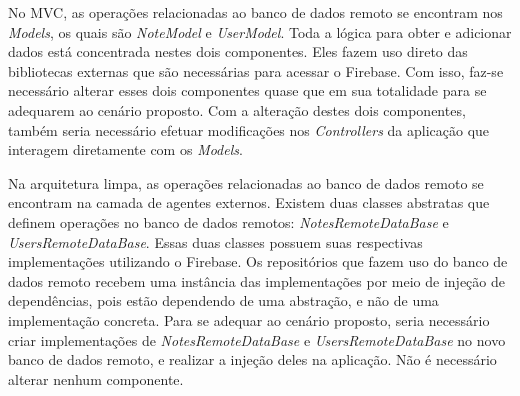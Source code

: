 No MVC, as operações relacionadas ao banco de dados remoto se encontram nos \emph{Models}, os quais são \emph{NoteModel} e \emph{UserModel}.
Toda a lógica para obter e adicionar dados está concentrada nestes dois componentes.
Eles fazem uso direto das bibliotecas externas que são necessárias para acessar o Firebase.
Com isso, faz-se necessário alterar esses dois componentes quase que em sua totalidade para se adequarem ao cenário proposto.
Com a alteração destes dois componentes, também seria necessário efetuar modificações nos \emph{Controllers} da aplicação que interagem diretamente com os \emph{Models}.

Na arquitetura limpa, as operações relacionadas ao banco de dados remoto se encontram na camada de agentes externos.
Existem duas classes abstratas que definem operações no banco de dados remotos: \emph{NotesRemoteDataBase} e \emph{UsersRemoteDataBase}.
Essas duas classes possuem suas respectivas implementações utilizando o Firebase.
Os repositórios que fazem uso do banco de dados remoto recebem uma instância das implementações por meio de injeção de dependências, pois estão dependendo de uma abstração, e não de uma implementação concreta.
Para se adequar ao cenário proposto, seria necessário criar implementações de \emph{NotesRemoteDataBase} e \emph{UsersRemoteDataBase} no novo banco de dados remoto, e realizar a injeção deles na aplicação.
Não é necessário alterar nenhum componente.